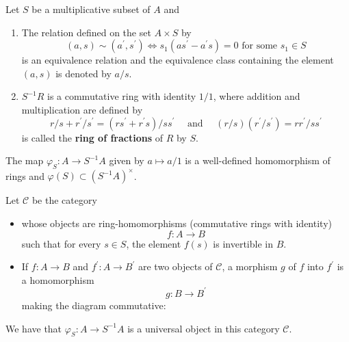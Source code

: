 \begin{definition}
    \label{thm: ring of quotients }
    Let $S$ be a multiplicative subset of $A$ and
    \begin{enumerate}
        \item
              The relation defined on the set ${A} \times {S}$ by
              \begin{equation*}
                  (a, s) \sim \left(a^{\prime}, s^{\prime}\right) \Leftrightarrow s_1\left(as^{\prime}-a^{\prime}s\right)=0 \text { for some } s_1 \in S
              \end{equation*}
              is an equivalence relation and the equivalence class containing the element $(a, s)$ is denoted by ${a} / {s}$.
        \item
              ${S}^{-1} {R}$ is a commutative ring with identity $1/1$, where addition and multiplication are defined by
              \begin{equation*}
                  {r} / {s}+{r}^{\prime} / {s}^{\prime}=\left({rs}^{\prime}+{r}^{\prime} {s}\right) / {ss}^{\prime} \quad \text { and } \quad({r} / {s})\left({r}^{\prime} / {s}^{\prime}\right)={rr}^{\prime} / {ss}^{\prime}
              \end{equation*}
              is called the \textbf{ring of fractions} of $R$ by $S$.
    \end{enumerate}
    \begin{remark}
        The map $\varphi_{S}: A \rightarrow {S}^{-1} {A}$ given by $a\mapsto a / 1$ is a well-defined homomorphism of rings and $\varphi\left(S\right) \subset \left({S}^{-1} {A}\right)^{\times}$.
    \end{remark}
\end{definition}
\begin{theorem}
    Let $\mathcal{C}$ be the category
    \begin{itemize}
        \item
              whose objects are ring-homomorphisms (commutative rings with identity)
              \begin{equation*}
                  f: A \rightarrow B
              \end{equation*}
              such that for every $s \in S$, the element $f(s)$ is invertible in $B$.
        \item
              If $f: A \rightarrow B$ and $f^{\prime}: A \rightarrow B^{\prime}$ are two objects of $\mathcal{C}$, a morphism $g$ of $f$ into $f^{\prime}$ is a homomorphism
              \begin{equation*}
                  g: B \rightarrow B^{\prime}
              \end{equation*}
              making the diagram commutative:
    \end{itemize}
    We have that $\varphi_S: A \rightarrow S^{-1}A$ is a universal object in this category $\mathcal{C}$.
\end{theorem}






